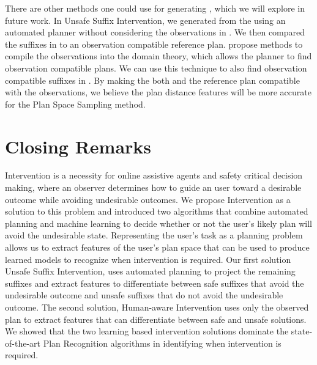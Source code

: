 There are other methods one could use for generating \Suffixes, which we will explore in future work.
In Unsafe Suffix Intervention, we generated \Suffixes from the \historyEndState using an automated planner without considering the observations in \historyDef.
We then compared the suffixes in \Suffixes to an observation compatible reference plan.
\cite{ramirez2009plan, ramirez2010probabilistic, sohrabi2016plan} propose methods to compile the observations into the domain theory, which allows the planner to find observation compatible plans.
We can use this technique to also find observation compatible suffixes in \Suffixes.
By making the both \Suffixes and the reference plan compatible with the observations, we believe the plan distance features will be more accurate for the Plan Space Sampling method.



\section{Closing Remarks}
\label{sec:closing}
Intervention is a necessity for online assistive agents and safety critical decision making, where an observer determines how to guide an user toward a desirable outcome while avoiding undesirable outcomes. 
We propose Intervention as a solution to this problem and introduced two algorithms that combine automated planning and machine learning to decide whether or not the user's likely plan will avoid the undesirable state. 
Representing the user's task as a planning problem allows us to extract features of the user's plan space that can be used to produce learned models to recognize when intervention is required. 
Our first solution Unsafe Suffix Intervention, uses automated planning to project the remaining suffixes and extract features to differentiate between safe suffixes that avoid the undesirable outcome and unsafe suffixes that do not avoid the undesirable outcome. 
The second solution, Human-aware Intervention uses only the observed plan to extract features that can differentiate between safe and unsafe solutions. 
We showed that the two learning based intervention solutions dominate the state-of-the-art Plan Recognition algorithms in identifying when intervention is required.

